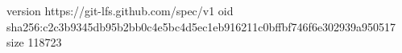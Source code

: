 version https://git-lfs.github.com/spec/v1
oid sha256:c2c3b9345db95b2bb0c4e5bc4d5ec1eb916211c0bffbf746f6e302939a950517
size 118723
